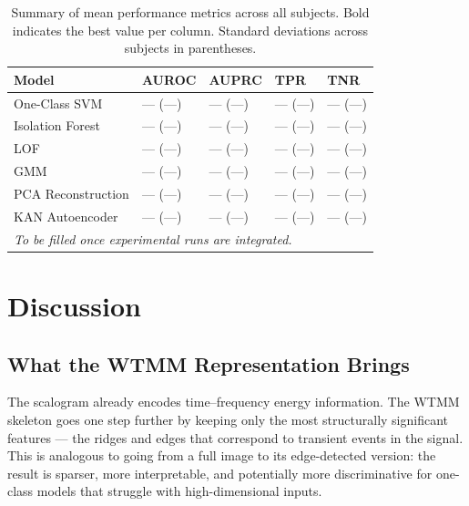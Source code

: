 \documentclass[12pt, a4paper]{article}
\begin{document}
\begin{table}[H]
  \centering
  \caption{Summary of mean performance metrics across all subjects.
    Bold indicates the best value per column.
    Standard deviations across subjects in parentheses.}
  \label{tab:results}
  \begin{tabularx}{\textwidth}{lXXXX}
    \toprule
    \textbf{Model} & \textbf{AUROC} & \textbf{AUPRC} & \textbf{TPR} & \textbf{TNR} \\
    \midrule
    One-Class SVM      & --- (---) & --- (---) & --- (---) & --- (---) \\
    Isolation Forest   & --- (---) & --- (---) & --- (---) & --- (---) \\
    LOF                & --- (---) & --- (---) & --- (---) & --- (---) \\
    GMM                & --- (---) & --- (---) & --- (---) & --- (---) \\
    PCA Reconstruction & --- (---) & --- (---) & --- (---) & --- (---) \\
    KAN Autoencoder    & --- (---) & --- (---) & --- (---) & --- (---) \\
    \bottomrule
    \multicolumn{5}{l}{\small \textit{To be filled once experimental runs are integrated.}} \\
  \end{tabularx}
\end{table}

\section{Discussion}
\label{sec:discussion}

\subsection{What the WTMM Representation Brings}

The scalogram already encodes time--frequency energy information.
The WTMM skeleton goes one step further by keeping only the most
structurally significant features --- the ridges and edges that correspond
to transient events in the signal. This is analogous to going from a
full image to its edge-detected version: the result is sparser, more
interpretable, and potentially more discriminative for one-class models
that struggle with high-dimensional inputs.
\end{document}
